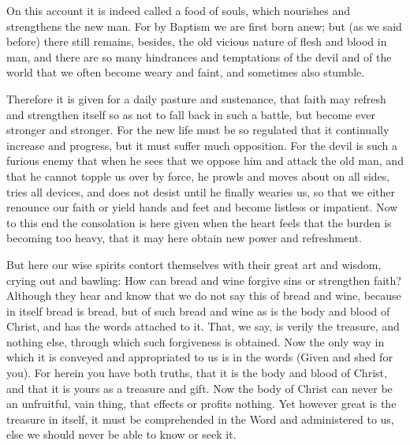 On this account it is indeed called a food of souls, which nourishes
and strengthens the new man. For by Baptism we are first born anew; but
(as we said before) there still remains, besides, the old vicious
nature of flesh and blood in man, and there are so many hindrances and
temptations of the devil and of the world that we often become weary
and faint, and sometimes also stumble.

Therefore it is given for a daily pasture and sustenance, that faith
may refresh and strengthen itself so as not to fall back in such a
battle, but become ever stronger and stronger. For the new life must be
so regulated that it continually increase and progress, but it must
suffer much opposition. For the devil is such a furious enemy that when
he sees that we oppose him and attack the old man, and that he cannot
topple us over by force, he prowls and moves about on all sides, tries
all devices, and does not desist until he finally wearies us, so that
we either renounce our faith or yield hands and feet and become
listless or impatient. Now to this end the consolation is here given
when the heart feels that the burden is becoming too heavy, that it may
here obtain new power and refreshment.

But here our wise spirits contort themselves with their great art and
wisdom, crying out and bawling: How can bread and wine forgive sins or
strengthen faith? Although they hear and know that we do not say this
of bread and wine, because in itself bread is bread, but of such bread
and wine as is the body and blood of Christ, and has the words attached
to it. That, we say, is verily the treasure, and nothing else, through
which such forgiveness is obtained. Now the only way in which it is
conveyed and appropriated to us is in the words (Given and shed for
you). For herein you have both truths, that it is the body and blood of
Christ, and that it is yours as a treasure and gift. Now the body of
Christ can never be an unfruitful, vain thing, that effects or profits
nothing. Yet however great is the treasure in itself, it must be
comprehended in the Word and administered to us, else we should never
be able to know or seek it.

